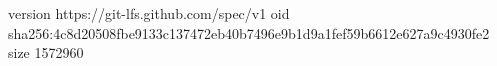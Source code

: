 version https://git-lfs.github.com/spec/v1
oid sha256:4c8d20508fbe9133c137472eb40b7496e9b1d9a1fef59b6612e627a9c4930fe2
size 1572960
